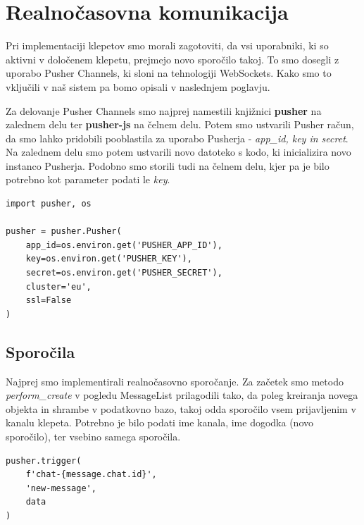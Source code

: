 \documentclass[a4paper,12pt,openright]{book}
\begin{document}
\section{Realnočasovna komunikacija}
Pri implementaciji klepetov smo morali zagotoviti, da vsi uporabniki, ki so aktivni v določenem klepetu, prejmejo novo sporočilo takoj.
To smo dosegli z uporabo Pusher Channels, ki sloni na tehnologiji WebSockets.
Kako smo to vključili v naš sistem pa bomo opisali v naslednjem poglavju.

Za delovanje Pusher Channels smo najprej namestili knjižnici \textbf{pusher} na zalednem delu ter \textbf{pusher-js} na čelnem delu.
Potem smo ustvarili Pusher račun, da smo lahko pridobili pooblastila za uporabo Pusherja - \textit{app\_id, key in secret}.
Na zalednem delu smo potem ustvarili novo datoteko s kodo, ki inicializira novo instanco Pusherja.
Podobno smo storili tudi na čelnem delu, kjer pa je bilo potrebno kot parameter podati le \textit{key}.
\begin{lstlisting}[label=code8,caption=Izvorna koda\, ki kreira novo instanco Pusherja na zalednem delu.,frame=tb,captionpos=b]
import pusher, os

pusher = pusher.Pusher(
    app_id=os.environ.get('PUSHER_APP_ID'),
    key=os.environ.get('PUSHER_KEY'),
    secret=os.environ.get('PUSHER_SECRET'),
    cluster='eu',
    ssl=False
)    
\end{lstlisting}

\subsection{Sporočila}
Najprej smo implementirali realnočasovno sporočanje.
Za začetek smo metodo \textit{perform\_create} v pogledu MessageList prilagodili tako, da poleg kreiranja novega objekta in shrambe v podatkovno bazo, takoj odda sporočilo vsem prijavljenim v kanalu klepeta.
Potrebno je bilo podati ime kanala, ime dogodka (novo sporočilo), ter vsebino samega sporočila.
\begin{lstlisting}[label=code9,caption=Pošiljanje novega sporočila vsem odjemalcem naročenim na kanal chat-{message.chat.id} z uporabo storitve Pusher.,frame=tb,captionpos=b]
pusher.trigger(
    f'chat-{message.chat.id}',
    'new-message',
    data
)
\end{lstlisting}
\end{document}
